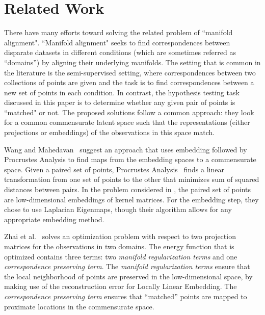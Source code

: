 \documentclass[12pt]{article} %
\begin{document}
\section{Related Work \label{sec:RelatedWork}}
There have many efforts toward solving the related problem of ``manifold alignment". ``Manifold alignment" seeks to find correspondences between disparate datasets in different conditions (which are  sometimes referred as ``domains'') by aligning their underlying manifolds. The setting that is common in the literature  is the semi-supervised setting\cite{Ham2005a}, where  correspondences between two collections of points  are given and the task is to find correspondences between a new set of points in each condition. In contrast, the hypothesis testing task discussed in this paper is to determine whether any given pair of points is ``matched" or not. The proposed solutions\cite{Wang2008,Zhai2010,3wayNMDS}
 follow a common approach: they look for a common commensurate latent space such that the representations (either projections or embeddings) of the observations in this space match.

Wang and Mahedavan~\cite{Wang2008} suggest an  approach that uses embedding followed by Procrustes Analysis to find maps from the embedding spaces to a commensurate space. Given a paired set of points, Procrustes Analysis~\cite{Sibson}  finds a linear transformation from one set of points to the other that minimizes sum of squared distances between pairs. In the problem considered in \cite{Wang2008}, the paired set of points are low-dimensional embeddings of kernel matrices. For the embedding step, they chose to use Laplacian Eigenmaps, though their algorithm allows for any appropriate embedding method.

 Zhai et al.~\cite{Zhai2010}  solves an optimization problem  with respect to  two projection matrices for the observations in two domains.  The energy function that is optimized contains three terms: two \emph{manifold regularization terms} and one \emph{correspondence preserving term}. The  \emph{manifold regularization terms} ensure that the local neighborhood of points are preserved in the low-dimensional space, by making use of the reconstruction error for Locally Linear Embedding\cite{Roweis_LLE}.
The \emph{correspondence preserving term} ensures that ``matched'' points are mapped to proximate locations in the commensurate space.
\end{document}
